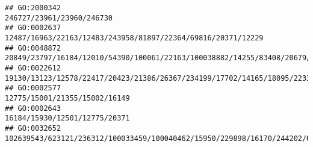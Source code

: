 \documentclass[
]{article}
\begin{document}
\begin{verbatim}
## GO:2000342                                                                                                                                                                                                                                                                                                                                                                                    246727/23961/23960/246730
## GO:0002637                                                                                                                                                                                                                                                                                                                                                 12487/16963/22163/12483/243958/81897/22364/69816/20371/12229
## GO:0048872                                                                                                                                                                                                                                          20849/23797/16184/12010/54390/100061/22163/100038882/14255/83408/20679/16797/24099/104271/12773/57916/12775/20533/321019/72049/15511/16149/20371/213439/12229/11656
## GO:0022612                                                                                                                                                                                                                                                                                                                        19130/13123/12578/22417/20423/21386/26367/234199/17702/14165/18095/22337/104156/19876
## GO:0002577                                                                                                                                                                                                                                                                                                                                                                                12775/15001/21355/15002/16149
## GO:0002643                                                                                                                                                                                                                                                                                                                                                                                16184/15930/12501/12775/20371
## GO:0032652                                                                                                                                                                                                                                                                                                                     102639543/623121/236312/100033459/100040462/15950/229898/16170/244202/637515/12775/54483

\end{verbatim}
\end{document}
